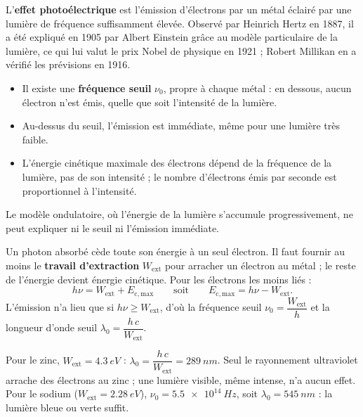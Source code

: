 \begin{definition}
L'\textbf{effet photoélectrique} est l'émission d'électrons par un métal éclairé par une lumière de fréquence
suffisamment élevée. Observé par Heinrich Hertz en 1887, il a été expliqué en 1905 par Albert Einstein grâce au modèle
particulaire de la lumière, ce qui lui valut le prix Nobel de physique en 1921 ; Robert Millikan en a vérifié les
prévisions en 1916.
\end{definition}
\begin{propriete}[Caractéristiques]
\begin{itemize}
\item Il existe une \textbf{fréquence seuil} $\nu_0$, propre à chaque métal : en dessous, aucun électron n'est émis, quelle
que soit l'intensité de la lumière.
\item Au-dessus du seuil, l'émission est immédiate, même pour une lumière très faible.
\item L'énergie cinétique maximale des électrons dépend de la fréquence de la lumière, pas de son intensité ; le
nombre d'électrons émis par seconde est proportionnel à l'intensité.
\end{itemize}
Le modèle ondulatoire, où l'énergie de la lumière s'accumule progressivement, ne peut expliquer ni le seuil ni
l'émission immédiate.
\end{propriete}
\begin{savoirfaire}
Un photon absorbé cède toute son énergie à un seul électron. Il faut fournir au moins le \textbf{travail d'extraction}
$W_\mathrm{ext}$ pour arracher un électron au métal ; le reste de l'énergie devient énergie cinétique. Pour les électrons
les moins liés :
\[h\nu=W_\mathrm{ext}+E_\mathrm{c,max}\qquad\text{soit}\qquad E_\mathrm{c,max}=h\nu-W_\mathrm{ext}.\]
L'émission n'a lieu que si $h\nu\geqslant W_\mathrm{ext}$, d'où la fréquence seuil $\nu_0=\dfrac{W_\mathrm{ext}}{h}$ et la longueur d'onde seuil
$\lambda_0=\dfrac{h\,c}{W_\mathrm{ext}}$.
\end{savoirfaire}
\begin{exemple}
Pour le zinc, $W_\mathrm{ext}=\qty{4,3}{eV}$ : $\lambda_0=\dfrac{h\,c}{W_\mathrm{ext}}=\qty{289}{nm}$. Seul le rayonnement ultraviolet arrache des
électrons au zinc ; une lumière visible, même intense, n'a aucun effet. Pour le sodium ($W_\mathrm{ext}=\qty{2,28}{eV}$),
$\nu_0=\qty{5,5e14}{Hz}$, soit $\lambda_0=\qty{545}{nm}$ : la lumière bleue ou verte suffit.
\end{exemple}
